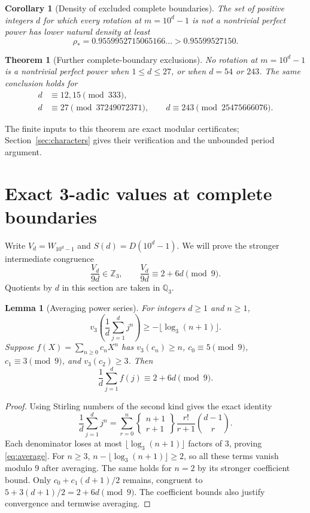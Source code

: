 \documentclass[10pt]{article}
\newtheorem{theorem}{Theorem}
\newtheorem{lemma}{Lemma}
\newtheorem{corollary}{Corollary}
\newcommand{\Z}{\mathbb Z}
\newcommand{\Q}{\mathbb Q}
\newcommand{\Stir}[2]{\left\{\begin{smallmatrix}#1\\#2\end{smallmatrix}\right\}}
\begin{document}
\begin{corollary}[Density of excluded complete boundaries]\label{cor:density-boundary}
The set of positive integers $d$ for which every rotation at $m=10^d-1$
is not a nontrivial perfect power has lower natural density at least
\[
 \rho_*=0.9559952715065166\ldots>0.95599527150.
\]

\end{corollary}

\begin{theorem}[Further complete-boundary exclusions]\label{thm:characters}
No rotation at $m=10^d-1$ is a nontrivial perfect power when
$1\le d\le27$, or when $d=54$ or $243$. The same conclusion holds for
\begin{equation}\label{eq:progressions}
 \begin{split}
 d&\equiv12,15\pmod{333},\\
 d&\equiv27\pmod{37249072371},\qquad
 d\equiv243\pmod{25475666076}.
 \end{split}
\end{equation}
\end{theorem}
The finite inputs to this theorem are exact modular certificates;
Section~\ref{sec:characters} gives their verification and the unbounded
period argument.

\section{Exact 3-adic values at complete boundaries}
Write $V_d=W_{10^d-1}$ and $S(d)=D(10^d-1)$. We will prove the stronger
intermediate congruence
\begin{equation}\label{eq:ratio}
 \frac{V_d}{9d}\in\Z_3,\qquad
 \frac{V_d}{9d}\equiv2+6d\pmod9.
\end{equation}
Quotients by $d$ in this section are taken in $\Q_3$.

\begin{lemma}[Averaging power series]\label{lem:average}
For integers $d\ge1$ and $n\ge1$,
\begin{equation}\label{eq:average}
 v_3\!\left(\frac1d\sum_{j=1}^d j^n\right)
 \ge-\lfloor\log_3(n+1)\rfloor.
\end{equation}
Suppose $f(X)=\sum_{n\ge0}c_nX^n$ has $v_3(c_n)\ge n$,
$c_0\equiv5\pmod9$, $c_1\equiv3\pmod9$, and $v_3(c_2)\ge3$.
Then
\begin{equation}\label{eq:faverage}
 \frac1d\sum_{j=1}^d f(j)\equiv2+6d\pmod9.
\end{equation}
\end{lemma}
\begin{proof}
Using Stirling numbers of the second kind gives the exact identity
\[
 \frac1d\sum_{j=1}^d j^n
 =\sum_{r=0}^n\Stir{n+1}{r+1}
       \frac{r!}{r+1}\binom{d-1}{r}.
\]
Each denominator loses at most $\lfloor\log_3(n+1)\rfloor$ factors of 3,
proving \eqref{eq:average}. For $n\ge3$,
$n-\lfloor\log_3(n+1)\rfloor\ge2$, so all these terms vanish modulo 9
after averaging. The same holds for $n=2$ by its stronger coefficient bound.
Only $c_0+c_1(d+1)/2$ remains, congruent to $5+3(d+1)/2=2+6d\pmod9$.
The coefficient bounds also justify convergence and termwise averaging.
\end{proof}
\end{document}
